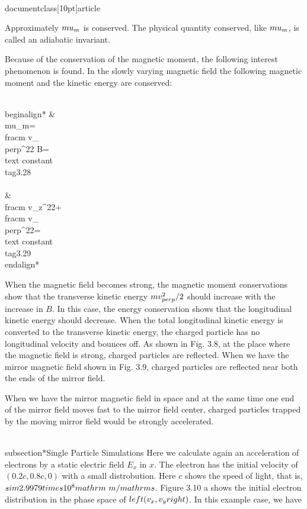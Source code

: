 \\documentclass[10pt]{article}
\begin{document}
Approximately $\\mu_{m}$ is conserved. The physical quantity conserved, like $\\mu_{m}$, is called an adiabatic invariant.

Because of the conservation of the magnetic moment, the following interest phenomenon is found. In the slowly varying magnetic field the following magnetic moment and the kinetic energy are conserved:


\\begin{align*}
& \\mu_{m}=\\frac{m v_{\\perp}^{2}}{2 B}=\\text { constant }  \\tag{3.28}\\\\
& \\frac{m v_{z}^{2}}{2}+\\frac{m v_{\\perp}^{2}}{2}=\\text { constant } \\tag{3.29}
\\end{align*}


When the magnetic field becomes strong, the magnetic moment conservations show that the transverse kinetic energy $m v_{\\perp}^{2} / 2$ should increase with the increase in $B$. In this case, the energy conservation shows that the longitudinal kinetic energy should decrease. When the total longitudinal kinetic energy is converted to the transverse kinetic energy, the charged particle has no longitudinal velocity and bounces off. As shown in Fig. 3.8, at the place where the magnetic field is strong, charged particles are reflected. When we have the mirror magnetic field shown in Fig. 3.9, charged particles are reflected near both the ends of the mirror field.

When we have the mirror magnetic field in space and at the same time one end of the mirror field moves fast to the mirror field center, charged particles trapped by the moving mirror field would be strongly accelerated.

\\subsection*{Single Particle Simulations}
Here we calculate again an acceleration of electrons by a static electric field $E_{x}$ in $x$. The electron has the initial velocity of $(0.2 c, 0.8 c, 0)$ with a small distrobution. Here $c$ shows the speed of light, that is, $\\sim 2.9979 \\times 10^{8} \\mathrm{~m} / \\mathrm{s}$. Figure 3.10 a shows the initial electron distribution in the phase space of $\\left(v_{x}, v_{y}\\right)$. In this example case, we have
\end{document}
